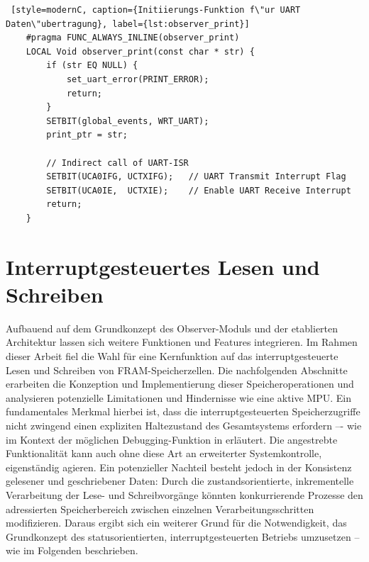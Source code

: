\vspace{0.5cm}
\begin{lstlisting} [style=modernC, caption={Initiierungs-Funktion f\"ur UART Daten\"ubertragung}, label={lst:observer_print}]
	#pragma FUNC_ALWAYS_INLINE(observer_print)
	LOCAL Void observer_print(const char * str) {
		if (str EQ NULL) {
			set_uart_error(PRINT_ERROR);
			return;
		}
		SETBIT(global_events, WRT_UART);
		print_ptr = str;
		
		// Indirect call of UART-ISR
		SETBIT(UCA0IFG, UCTXIFG);   // UART Transmit Interrupt Flag
		SETBIT(UCA0IE,  UCTXIE);    // Enable UART Receive Interrupt
		return;
	}
\end{lstlisting}


\newpage
\section{Interruptgesteuertes Lesen und Schreiben}
\label{sec:Interruptgesteuertes_Lesen&Schreiben}

Aufbauend auf dem Grundkonzept des Observer-Moduls und der etablierten Architektur lassen sich weitere Funktionen und Features integrieren. Im Rahmen dieser Arbeit fiel die Wahl f\"ur eine Kernfunktion auf das interruptgesteuerte Lesen und Schreiben von FRAM-Speicherzellen. Die nachfolgenden Abschnitte erarbeiten die Konzeption und Implementierung dieser Speicheroperationen und analysieren potenzielle Limitationen und Hindernisse wie eine aktive MPU. Ein fundamentales Merkmal hierbei ist, dass die interruptgesteuerten Speicherzugriffe nicht zwingend einen expliziten Haltezustand des Gesamtsystems erfordern –- wie im Kontext der m\"oglichen Debugging-Funktion in  erl\"autert. Die angestrebte Funktionalit\"at kann auch ohne diese Art an erweiterter Systemkontrolle, eigenst\"andig agieren. Ein potenzieller Nachteil besteht jedoch in der Konsistenz gelesener und geschriebener Daten: Durch die zustandsorientierte, inkrementelle Verarbeitung der Lese- und Schreibvorg\"ange k\"onnten konkurrierende Prozesse den adressierten Speicherbereich zwischen einzelnen Verarbeitungsschritten modifizieren. Daraus ergibt sich ein weiterer Grund f\"ur die Notwendigkeit, das Grundkonzept des statusorientierten, interruptgesteuerten Betriebs umzusetzen – wie im Folgenden beschrieben.


